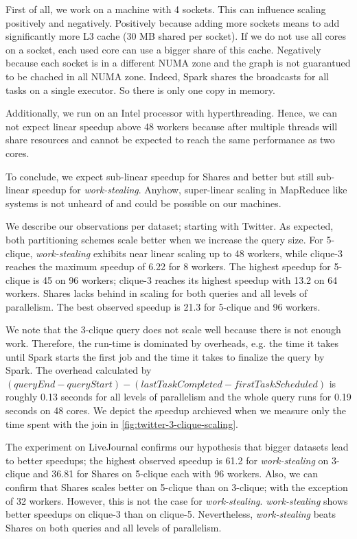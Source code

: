 First of all, we work on a machine with 4 sockets.
This can influence scaling positively and negatively.
Positively because adding more sockets means to add significantly more L3 cache (30 MB shared per socket).
If we do not use all cores on a socket, each used core can use a bigger share of this cache.
Negatively because each socket is in a different NUMA zone and the graph is not guarantued to be chached in all
NUMA zone.
Indeed, Spark shares the broadcasts for all tasks on a single executor.
So there is only one copy in memory.

Additionally, we run on an Intel processor with hyperthreading.
Hence, we can not expect linear speedup above 48 workers because after multiple threads will share resources and cannot be
expected to reach the same performance as two cores.

To conclude, we expect sub-linear speedup for Shares and better but still sub-linear speedup for \textit{work-stealing}.
Anyhow, super-linear scaling in MapReduce like systems is not unheard of and could be possible on our machines.

We describe our observations per dataset;
starting with Twitter.
As expected, both partitioning schemes scale better when we increase the query size.
For 5-clique, \textit{work-stealing} exhibits near linear scaling up to 48 workers, while
clique-3 reaches the maximum speedup of 6.22 for 8 workers.
The highest speedup for 5-clique is 45 on 96 workers; clique-3 reaches its highest speedup
with 13.2 on 64 workers.
Shares lacks behind in scaling for both queries and all levels of parallelism.
The best observed speedup is 21.3 for 5-clique and 96 workers.

We note that the 3-clique query does not scale well because there is not enough work.
Therefore, the run-time is dominated by overheads, e.g. the time it takes until Spark starts
the first job and the time it takes to finalize the query by Spark.
The overhead calculated by $(queryEnd - queryStart) - (lastTaskCompleted - firstTaskScheduled)$ is
roughly 0.13 seconds for all levels of parallelism and the whole query runs for 0.19 seconds on
48 cores.
We depict the speedup archieved when we measure only the time spent with the join in \cref{fig:twitter-3-clique-scaling}.


The experiment on LiveJournal confirms our hypothesis that bigger datasets lead to better
speedups;
the highest observed speedup is 61.2 for \textit{work-stealing} on 3-clique and
36.81 for Shares on 5-clique each with 96 workers.
Also, we can confirm that Shares scales better on 5-clique than on 3-clique; with the exception of 32 workers.
However, this is not the case for \textit{work-stealing}.
\textit{work-stealing} shows better speedups on clique-3 than on clique-5.
Nevertheless, \textit{work-stealing} beats Shares on both queries and all levels of parallelism.

